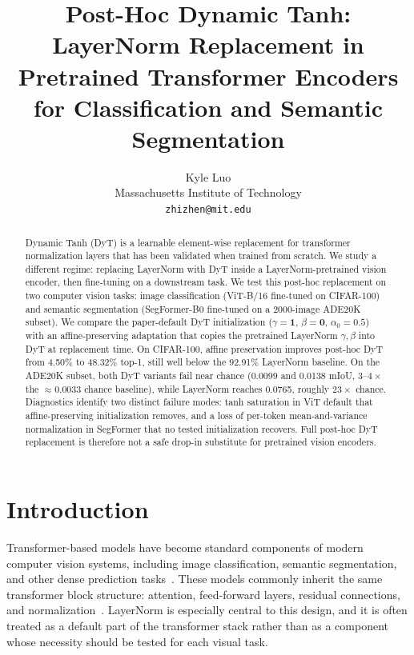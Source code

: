 \documentclass[10pt,twocolumn,letterpaper]{article}
\begin{document}
\title{Post-Hoc Dynamic Tanh: LayerNorm Replacement in Pretrained Transformer Encoders for Classification and Semantic Segmentation}

\author{Kyle Luo\\
Massachusetts Institute of Technology\\
{\tt\small zhizhen@mit.edu}
}

\maketitle

\begin{abstract}
Dynamic Tanh (DyT) is a learnable element-wise replacement for transformer normalization layers that has been validated when trained from scratch. We study a different regime: replacing LayerNorm with DyT inside a LayerNorm-pretrained vision encoder, then fine-tuning on a downstream task. We test this post-hoc replacement on two computer vision tasks: image classification (ViT-B/16 fine-tuned on CIFAR-100) and semantic segmentation (SegFormer-B0 fine-tuned on a 2000-image ADE20K subset). We compare the paper-default DyT initialization ($\gamma{=}\mathbf{1}$, $\beta{=}\mathbf{0}$, $\alpha_0{=}0.5$) with an affine-preserving adaptation that copies the pretrained LayerNorm $\gamma, \beta$ into DyT at replacement time. On CIFAR-100, affine preservation improves post-hoc DyT from 4.50\% to 48.32\% top-1, still well below the 92.91\% LayerNorm baseline. On the ADE20K subset, both DyT variants fail near chance (0.0099 and 0.0138 mIoU, $3$--$4\times$ the $\approx 0.0033$ chance baseline), while LayerNorm reaches 0.0765, roughly $23\times$ chance. Diagnostics identify two distinct failure modes: tanh saturation in ViT default that affine-preserving initialization removes, and a loss of per-token mean-and-variance normalization in SegFormer that no tested initialization recovers. Full post-hoc DyT replacement is therefore not a safe drop-in substitute for pretrained vision encoders.
\end{abstract}
\section{Introduction}
\label{sec:intro}

Transformer-based models have become standard components of modern computer vision systems, including image classification, semantic segmentation, and other dense prediction tasks~\cite{dosovitskiy2021vit,xie2021segformer}. These models commonly inherit the same transformer block structure: attention, feed-forward layers, residual connections, and normalization~\cite{vaswani2017attention}. LayerNorm is especially central to this design, and it is often treated as a default part of the transformer stack rather than as a component whose necessity should be tested for each visual task.
\end{document}
